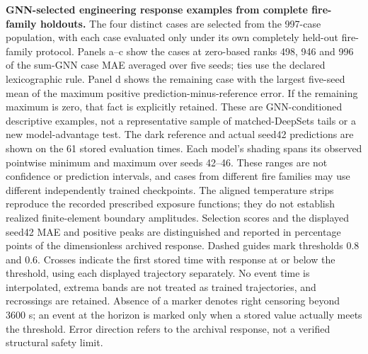 \textbf{GNN-selected engineering response examples from complete fire-family holdouts.}
The four distinct cases are selected from the 997-case population, with each case evaluated only under its own completely held-out fire-family protocol. Panels a--c show the cases at zero-based ranks 498, 946 and 996 of the sum-GNN case MAE averaged over five seeds; ties use the declared lexicographic rule. Panel d shows the remaining case with the largest five-seed mean of the maximum positive prediction-minus-reference error. If the remaining maximum is zero, that fact is explicitly retained. These are GNN-conditioned descriptive examples, not a representative sample of matched-DeepSets tails or a new model-advantage test.
The dark reference and actual seed42 predictions are shown on the 61 stored evaluation times. Each model's shading spans its observed pointwise minimum and maximum over seeds 42--46. These ranges are not confidence or prediction intervals, and cases from different fire families may use different independently trained checkpoints. The aligned temperature strips reproduce the recorded prescribed exposure functions; they do not establish realized finite-element boundary amplitudes. Selection scores and the displayed seed42 MAE and positive peaks are distinguished and reported in percentage points of the dimensionless archived response.
Dashed guides mark thresholds 0.8 and 0.6. Crosses indicate the first stored time with response at or below the threshold, using each displayed trajectory separately. No event time is interpolated, extrema bands are not treated as trained trajectories, and recrossings are retained. Absence of a marker denotes right censoring beyond 3600 s; an event at the horizon is marked only when a stored value actually meets the threshold. Error direction refers to the archival response, not a verified structural safety limit.
